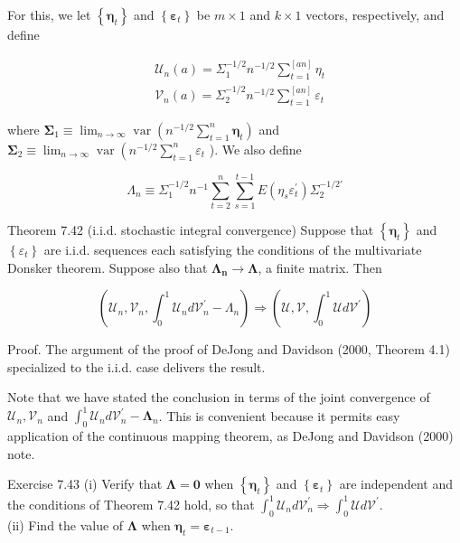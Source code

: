 \documentclass[10pt]{article}
\begin{document}
For this, we let $\left\{\boldsymbol{\eta}_{t}\right\}$ and $\left\{\boldsymbol{\varepsilon}_{t}\right\}$ be $m \times 1$ and $k \times 1$ vectors, respectively, and define

$$
\begin{aligned}
& \mathcal{U}_{n}(a)=\Sigma_{1}^{-1 / 2} n^{-1 / 2} \sum_{t=1}^{[a n]} \eta_{t} \\
& \mathcal{V}_{n}(a)=\Sigma_{2}^{-1 / 2} n^{-1 / 2} \sum_{t=1}^{[a n]} \varepsilon_{t}
\end{aligned}
$$

where $\boldsymbol{\Sigma}_{1} \equiv \lim _{n \rightarrow \infty} \operatorname{var}\left(n^{-1 / 2} \sum_{t=1}^{n} \boldsymbol{\eta}_{t}\right)$ and $\boldsymbol{\Sigma}_{2} \equiv \lim _{n \rightarrow \infty} \operatorname{var}\left(n^{-1 / 2}\right. \sum_{t=1}^{n} \varepsilon_{t}$ ). We also define

$$
\Lambda_{n} \equiv \Sigma_{1}^{-1 / 2} n^{-1} \sum_{t=2}^{n} \sum_{s=1}^{t-1} E\left(\eta_{s} \varepsilon_{t}^{\prime}\right) \Sigma_{2}^{-1 / 2 \prime}
$$

Theorem 7.42 (i.i.d. stochastic integral convergence) Suppose that $\left\{\boldsymbol{\eta}_{t}\right\}$ and $\left\{\varepsilon_{t}\right\}$ are i.i.d. sequences each satisfying the conditions of the multivariate Donsker theorem. Suppose also that $\mathbf{\Lambda}_{\boldsymbol{n}} \rightarrow \mathbf{\Lambda}$, a finite matrix. Then

$$
\left(\mathcal{U}_{n}, \mathcal{V}_{n}, \int_{0}^{1} \mathcal{U}_{n} d \mathcal{V}_{n}^{\prime}-\Lambda_{n}\right) \Rightarrow\left(\mathcal{U}, \mathcal{V}, \int_{0}^{1} \mathcal{U} d \mathcal{V}^{\prime}\right)
$$

Proof. The argument of the proof of DeJong and Davidson (2000, Theorem 4.1) specialized to the i.i.d. case delivers the result.

Note that we have stated the conclusion in terms of the joint convergence of $\mathcal{U}_{n}, \mathcal{V}_{n}$ and $\int_{0}^{1} \mathcal{U}_{n} d \mathcal{V}_{n}^{\prime}-\boldsymbol{\Lambda}_{n}$. This is convenient because it permits easy application of the continuous mapping theorem, as DeJong and Davidson (2000) note.

Exercise 7.43 (i) Verify that $\boldsymbol{\Lambda}=\mathbf{0}$ when $\left\{\boldsymbol{\eta}_{t}\right\}$ and $\left\{\boldsymbol{\varepsilon}_{t}\right\}$ are independent and the conditions of Theorem 7.42 hold, so that $\int_{0}^{1} \mathcal{U}_{n} d \mathcal{V}_{n}^{\prime} \Rightarrow \int_{0}^{1} \mathcal{U} d \mathcal{V}^{\prime}$.\\
(ii) Find the value of $\boldsymbol{\Lambda}$ when $\boldsymbol{\eta}_{t}=\boldsymbol{\varepsilon}_{t-1}$.
\end{document}
